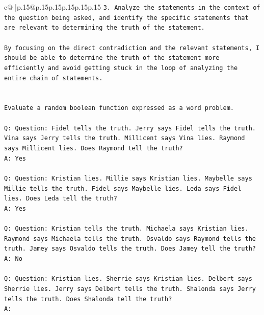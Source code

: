 \documentclass{article}
\begin{document}
{\begin{supertabular}{c@{$\;$}|p{.15\linewidth}@{}p{.15\linewidth}p{.15\linewidth}p{.15\linewidth}p{.15\linewidth}p{.15\linewidth}}
{{{\texttt{3. Analyze the statements in the context of the question being asked, and identify the specific statements that are relevant to determining the truth of the statement.} \\
\\ 
\texttt{By focusing on the direct contradiction and the relevant statements, I should be able to determine the truth of the statement more efficiently and avoid getting stuck in the loop of analyzing the entire chain of statements.} \\
\\ 
\\ 
\texttt{Evaluate a random boolean function expressed as a word problem.} \\
\\ 
\texttt{Q: Question: Fidel tells the truth. Jerry says Fidel tells the truth. Vina says Jerry tells the truth. Millicent says Vina lies. Raymond says Millicent lies. Does Raymond tell the truth?} \\
\texttt{A: Yes} \\
\\ 
\texttt{Q: Question: Kristian lies. Millie says Kristian lies. Maybelle says Millie tells the truth. Fidel says Maybelle lies. Leda says Fidel lies. Does Leda tell the truth?} \\
\texttt{A: Yes} \\
\\ 
\texttt{Q: Question: Kristian tells the truth. Michaela says Kristian lies. Raymond says Michaela tells the truth. Osvaldo says Raymond tells the truth. Jamey says Osvaldo tells the truth. Does Jamey tell the truth?} \\
\texttt{A: No} \\
\\ 
\texttt{Q: Question: Kristian lies. Sherrie says Kristian lies. Delbert says Sherrie lies. Jerry says Delbert tells the truth. Shalonda says Jerry tells the truth. Does Shalonda tell the truth?} \\
\texttt{A:} \\
            }
        }
    }
     \\ \\


\end{supertabular}}
\end{document}
